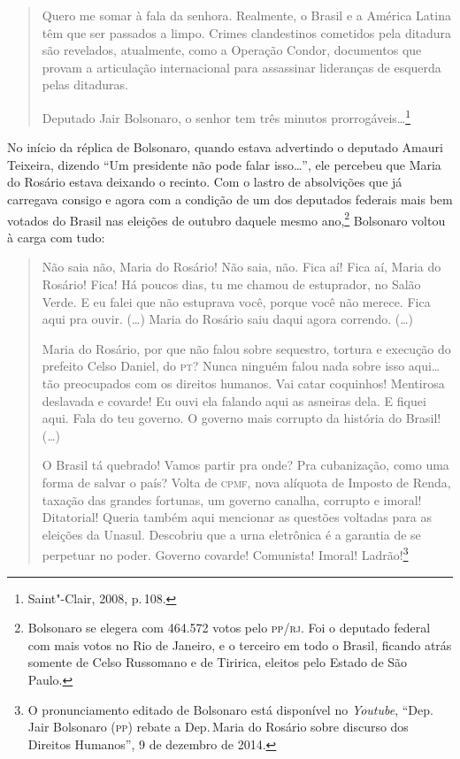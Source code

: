 \begin{quote}
Quero me somar à fala da senhora. Realmente, o Brasil e a América Latina
têm que ser passados a limpo. Crimes clandestinos cometidos pela
ditadura são revelados, atualmente, como a Operação Condor, documentos
que provam a articulação internacional para assassinar lideranças de
esquerda pelas ditaduras.

Deputado Jair Bolsonaro, o senhor tem três minutos
prorrogáveis\ldots{}\footnote{Saint"-Clair, 2008, p.\,108.}
\end{quote}

No início da réplica de Bolsonaro, quando estava advertindo o deputado
Amauri Teixeira, dizendo ``Um presidente não pode falar isso\ldots{}'', ele
percebeu que Maria do Rosário estava deixando o recinto. Com o lastro de
absolvições que já carregava consigo e agora com a condição de um dos
deputados federais mais bem votados do Brasil nas eleições de outubro
daquele mesmo ano,\footnote{Bolsonaro se elegera com 464.572 votos pelo
  \textsc{pp}/\textsc{rj}. Foi o deputado federal com mais votos no Rio de Janeiro, e o
  terceiro em todo o Brasil, ficando atrás somente de Celso Russomano e
  de Tiririca, eleitos pelo Estado de São Paulo.} Bolsonaro voltou à
carga com tudo:

\begin{quote}
Não saia não, Maria do Rosário! Não saia, não. Fica aí! Fica aí, Maria
do Rosário! Fica! Há poucos dias, tu me chamou de estuprador, no Salão
Verde. E eu falei que não estuprava você, porque você não merece. Fica
aqui pra ouvir. (\ldots{}) Maria do Rosário saiu daqui agora correndo. (\ldots{})

Maria do Rosário, por que não falou sobre sequestro, tortura e execução
do prefeito Celso Daniel, do \textsc{pt}? Nunca ninguém falou nada sobre isso
aqui\ldots{} tão preocupados com os direitos humanos. Vai catar coquinhos!
Mentirosa deslavada e covarde! Eu ouvi ela falando aqui as asneiras
dela. E fiquei aqui. Fala do teu governo. O governo mais corrupto da
história do Brasil! (\ldots{})

O Brasil tá quebrado! Vamos partir pra onde? Pra cubanização, como uma
forma de salvar o país? Volta de \textsc{cpmf}, nova alíquota de Imposto de
Renda, taxação das grandes fortunas, um governo canalha, corrupto e
imoral! Ditatorial! Queria também aqui mencionar as questões voltadas
para as eleições da Unasul. Descobriu que a urna eletrônica é a garantia
de se perpetuar no poder. Governo covarde! Comunista! Imoral!
Ladrão!\footnote{O pronunciamento editado de Bolsonaro está disponível no
  \emph{Youtube}, ``Dep.\,Jair Bolsonaro (\textsc{pp}) rebate a Dep.\,Maria do Rosário sobre discurso dos Direitos Humanos'', 9 de dezembro de 2014.}
\end{quote}

